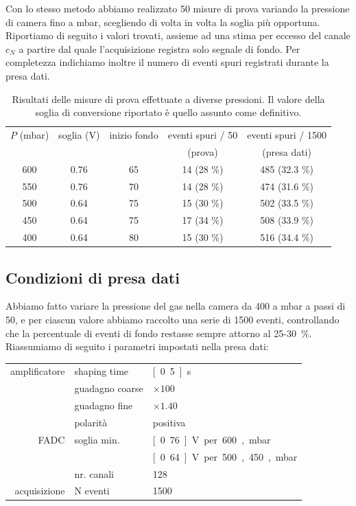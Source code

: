 \documentclass[italian,a4paper]{article}
\begin{document}
Con lo stesso metodo abbiamo realizzato 50 misure di prova variando la pressione di camera fino a \unit[400]{mbar}, scegliendo di volta in volta la soglia pi\`u opportuna. Riportiamo di seguito i valori trovati, assieme ad una stima per eccesso del canale $c_N$ a partire dal quale l'acquisizione registra solo segnale di fondo. Per completezza indichiamo inoltre il numero di eventi spuri registrati durante la presa dati.
\begin{table}[h!]\centering
\begin{tabular}{*5c}
$P$ (mbar)&	soglia (V)&	inizio fondo& 	eventi spuri / 50&	eventi spuri / 1500\\
&		&		&		(prova)&		(presa dati)\\\hline
600&		0.76&		65&		14 (28 \%)&		485 (32.3 \%)\\
550&		0.76&		70&		14 (28 \%)&		474 (31.6 \%)\\
500&		0.64&		75&		15 (30 \%)&		502 (33.5 \%)\\
450&		0.64&		75&		17 (34 \%)&		508 (33.9 \%)\\
400&		0.64&		80&		15 (30 \%)&		516 (34.4 \%)
\end{tabular}
\caption{Risultati delle misure di prova effettuate a diverse pressioni. Il valore della soglia di conversione riportato \`e quello assunto come definitivo.}
\end{table} 
\subsection*{Condizioni di presa dati}
Abbiamo fatto variare la pressione del gas nella camera da 400 a \unit[600]{mbar} a passi di 50, e per ciascun valore abbiamo raccolto una serie di 1500 eventi, controllando che la percentuale di eventi di fondo restasse sempre attorno al 25-30~\%.
Riassumiamo di seguito i parametri impostati nella presa dati:
\begin{table}[h!]\centering
\begin{tabular}{rll}
amplificatore&		shaping time&		\unit[0.5]{\micro s}\\
&			guadagno coarse&	$\times 100$\\
&			guadagno fine&		$\times 1.40$\\
&			polarit\`a&		positiva\\
FADC&			soglia min.&		\unit[0.76]{V} per 600, \unit[550]{mbar}\\
&			&			\unit[0.64]{V} per 500, 450, \unit[400]{mbar}\\
&			nr. canali&		128\\
acquisizione&		N eventi&		1500
\end{tabular}
\end{table}
\end{document}
